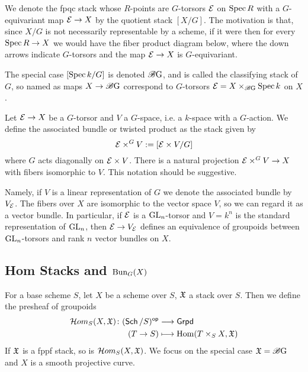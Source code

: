 \documentclass[12pt]{article}
\begin{document}
We denote the fpqc stack whose $R$-points are $G$-torsors $\mathcal{E}$ on $\operatorname{Spec} R$ with a $G$-equivariant map $\mathcal{E} \to X$ by the quotient stack $[X/G]$. The motivation is that, since $X/G$ is not necessarily representable by a scheme, if it were then for every $\operatorname{Spec} R \to X$ we would have the fiber product diagram below, where the down arrows indicate $G$-torsors and the map $\mathcal{E} \to X$ is $G$-equivariant.
\begin{figure}[H]
    \centering
\end{figure}
The special case $[\operatorname{Spec} k/G]$ is denoted $\operatorname{\mathscr{B} G}$, and is called the classifying stack of $G$, so named as maps $X \to \operatorname{\mathscr{B} G}$ correspond to $G$-torsors $\mathcal{E} = X \times_{\operatorname{\mathscr{B} G}} \operatorname{Spec} k$ on $X$.

Let $\mathcal{E} \to X$ be a $G$-torsor and $V$ a $G$-space, i.e. a $k$-space with a $G$-action. We define the associated bundle or twisted product as the stack given by
\[\mathcal{E} \times^G V := [\mathcal{E} \times V/G]\]
where $G$ acts diagonally on $\mathcal{E} \times V$. There is a natural projection $\mathcal{E} \times^G V \to X$ with fibers isomorphic to $V$. This notation should be suggestive.

Namely, if $V$ is a linear representation of $G$ we denote the associated bundle by $V_{\mathcal{E}}$. The fibers over $X$ are isomorphic to the vector space $V$, so we can regard it as a vector bundle. In particular, if $\mathcal{E}$ is a $\operatorname{GL}_n$-torsor and $V = k^n$ is the standard representation of $\operatorname{GL}_n$, then $\mathcal{E} \to V_{\mathcal{E}}$ defines an equivalence of groupoids between $\operatorname{GL}_n$-torsors and rank $n$ vector bundles on $X$.

\subsection{Hom Stacks and $\operatorname{Bun}_G(X)$}

For a base scheme $S$, let $X$ be a scheme over $S$, $\mathfrak{X}$ a stack over $S$. Then we define the presheaf of groupoids
\begin{align*}
    \mathcal{H} om_S(X, \mathfrak{X}) \colon (\operatorname{\mathsf{Sch}}/S)^{\operatorname{\mathsf{op}}} &\longrightarrow \operatorname{\mathsf{Grpd}} \\
    (T \to S) &\longmapsto \operatorname{Hom}(T \times_S X, \mathfrak{X})
\end{align*}
If $\mathfrak{X}$ is a fppf stack, so is $\mathcal{H} om_S(X, \mathfrak{X})$. We focus on the special case $\mathfrak{X} = \operatorname{\mathscr{B} G}$ and $X$ is a smooth projective curve.
\end{document}

